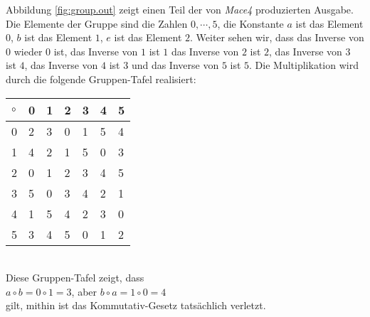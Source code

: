 Abbildung \ref{fig:group.out} zeigt einen Teil der von \textsl{Mace4} produzierten Ausgabe.
Die Elemente der Gruppe sind die Zahlen $0, \cdots, 5$, die Konstante $a$ ist das Element $0$,
$b$ ist das Element $1$, $e$ ist das Element $2$.  Weiter sehen wir, dass das Inverse von $0$ wieder $0$ ist,
das Inverse von $1$ ist $1$ das Inverse von $2$ ist $2$, das Inverse von $3$ ist $4$, das Inverse von $4$ ist
$3$ und das Inverse von $5$ ist $5$.  Die Multiplikation wird durch die folgende Gruppen-Tafel realisiert:
\\[0.2cm]
\hspace*{1.3cm}
\hspace*{1.3cm}
\begin{tabular}[t]{|l||l|l|l|l|l|l|}
\hline
$\circ$ & 0 & 1 & 2 & 3 & 4 & 5 \\
\hline
\hline
      0 & 2 & 3 & 0 & 1 & 5 & 4 \\
\hline
      1 & 4 & 2 & 1 & 5 & 0 & 3 \\
\hline
      2 & 0 & 1 & 2 & 3 & 4 & 5 \\
\hline
      3 & 5 & 0 & 3 & 4 & 2 & 1 \\
\hline
      4 & 1 & 5 & 4 & 2 & 3 & 0 \\
\hline
      5 & 3 & 4 & 5 & 0 & 1 & 2 \\
\hline
\end{tabular}
\\[0.2cm]
Diese Gruppen-Tafel zeigt, dass
\\[0.2cm]
\hspace*{1.3cm}
$a \circ b = 0 \circ 1 = 3$, \quad aber \quad
$b \circ a = 1 \circ 0 = 4$
\\[0.2cm]
gilt, mithin ist das Kommutativ-Gesetz tats\"{a}chlich verletzt.

